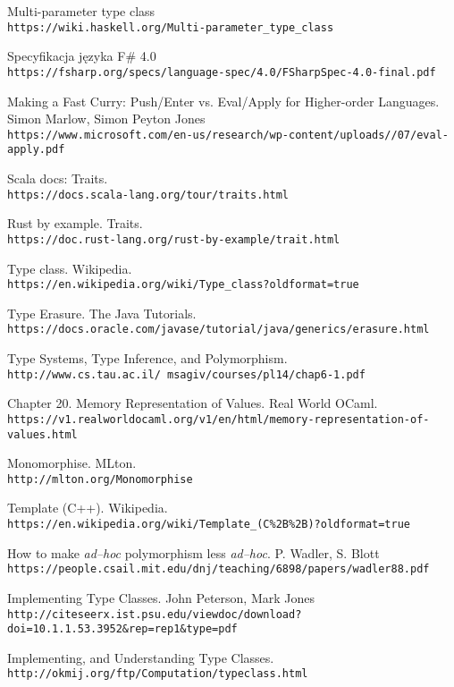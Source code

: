 \documentclass[declaration,shortabstract]{iithesis}
\begin{document}
\begin{thebibliography}{1}
Multi-parameter type class
\\\texttt{https://wiki.haskell.org/Multi-parameter\_type\_class}

Specyfikacja języka F\# 4.0
\\\texttt{https://fsharp.org/specs/language-spec/4.0/FSharpSpec-4.0-final.pdf}

Making a Fast Curry: Push/Enter vs.
Eval/Apply for Higher-order Languages. Simon Marlow, Simon Peyton Jones
\\\texttt{https://www.microsoft.com/en-us/research/wp-content/uploads//07/eval-apply.pdf}

Scala docs: Traits.
\\\texttt{https://docs.scala-lang.org/tour/traits.html}

Rust by example. Traits.
\\\texttt{https://doc.rust-lang.org/rust-by-example/trait.html}

Type class. Wikipedia.
\\\texttt{https://en.wikipedia.org/wiki/Type\_class?oldformat=true}

Type Erasure. The Java Tutorials.
\\\texttt{https://docs.oracle.com/javase/tutorial/java/generics/erasure.html}

Type Systems, Type Inference, and Polymorphism.
\\\texttt{http://www.cs.tau.ac.il/~msagiv/courses/pl14/chap6-1.pdf}

Chapter 20. Memory Representation of Values. Real World OCaml.
\\\texttt
{https://v1.realworldocaml.org/v1/en/html/memory-representation-of-values.html}

Monomorphise. MLton.
\\\texttt
{http://mlton.org/Monomorphise}

Template (C++). Wikipedia.
\\\texttt
{https://en.wikipedia.org/wiki/Template\_(C\%2B\%2B)?oldformat=true}

How to make \textit{ad--hoc} polymorphism less \textit{ad--hoc}. 
P. Wadler, S. Blott
\\\texttt
{https://people.csail.mit.edu/dnj/teaching/6898/papers/wadler88.pdf}

Implementing Type Classes. John Peterson, Mark Jones
\\\texttt
{http://citeseerx.ist.psu.edu/viewdoc/download?doi=10.1.1.53.3952\&rep=rep1\&type=pdf}

Implementing, and Understanding Type Classes.
\\\texttt
{http://okmij.org/ftp/Computation/typeclass.html}

\end{thebibliography}
\end{document}
